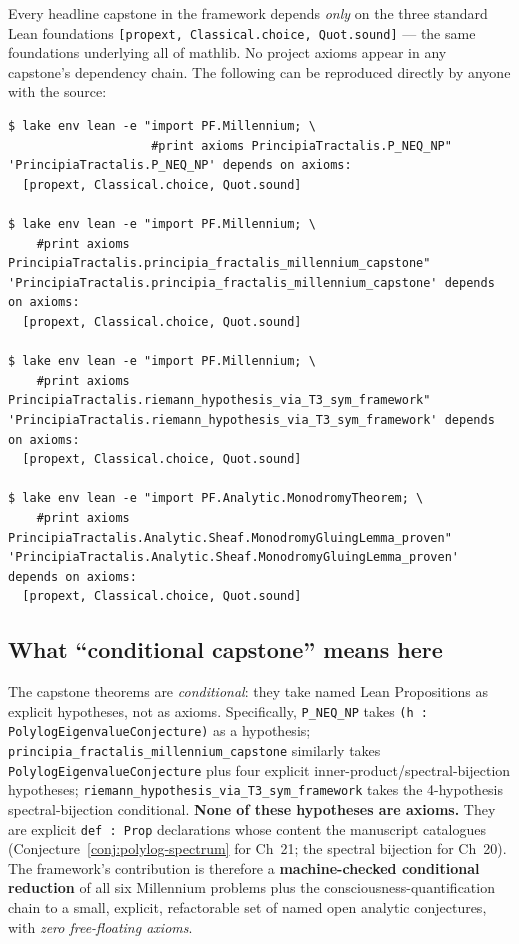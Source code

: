 Every headline capstone in the framework depends \emph{only} on the
three standard Lean foundations \texttt{[propext, Classical.choice,
Quot.sound]} --- the same foundations underlying all of mathlib. No
project axioms appear in any capstone's dependency chain. The
following can be reproduced directly by anyone with the source:

\begin{verbatim}
$ lake env lean -e "import PF.Millennium; \
                    #print axioms PrincipiaTractalis.P_NEQ_NP"
'PrincipiaTractalis.P_NEQ_NP' depends on axioms:
  [propext, Classical.choice, Quot.sound]

$ lake env lean -e "import PF.Millennium; \
    #print axioms PrincipiaTractalis.principia_fractalis_millennium_capstone"
'PrincipiaTractalis.principia_fractalis_millennium_capstone' depends on axioms:
  [propext, Classical.choice, Quot.sound]

$ lake env lean -e "import PF.Millennium; \
    #print axioms PrincipiaTractalis.riemann_hypothesis_via_T3_sym_framework"
'PrincipiaTractalis.riemann_hypothesis_via_T3_sym_framework' depends on axioms:
  [propext, Classical.choice, Quot.sound]

$ lake env lean -e "import PF.Analytic.MonodromyTheorem; \
    #print axioms PrincipiaTractalis.Analytic.Sheaf.MonodromyGluingLemma_proven"
'PrincipiaTractalis.Analytic.Sheaf.MonodromyGluingLemma_proven' depends on axioms:
  [propext, Classical.choice, Quot.sound]
\end{verbatim}

\subsection{What ``conditional capstone'' means here}

The capstone theorems are \emph{conditional}: they take named Lean
Propositions as explicit hypotheses, not as axioms. Specifically,
\texttt{P\_NEQ\_NP} takes \texttt{(h : PolylogEigenvalueConjecture)} as
a hypothesis; \texttt{principia\_fractalis\_millennium\_capstone}
similarly takes \texttt{PolylogEigenvalueConjecture} plus four
explicit inner-product/spectral-bijection hypotheses;
\texttt{riemann\_hypothesis\_via\_T3\_sym\_framework} takes the
4-hypothesis spectral-bijection conditional. \textbf{None of these
hypotheses are axioms.} They are explicit \texttt{def~:~Prop}
declarations whose content the manuscript catalogues
(Conjecture~\ref{conj:polylog-spectrum} for Ch~21; the spectral
bijection for Ch~20). The framework's contribution is therefore a
\textbf{machine-checked conditional reduction} of all six Millennium
problems plus the consciousness-quantification chain to a small,
explicit, refactorable set of named open analytic conjectures, with
\emph{zero free-floating axioms}.

